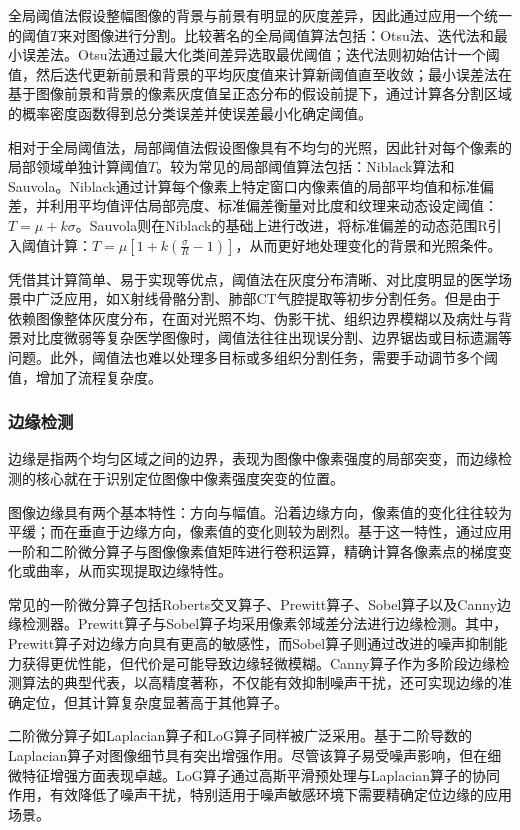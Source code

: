 全局阈值法假设整幅图像的背景与前景有明显的灰度差异，因此通过应用一个统一的阈值$T$来对图像进行分割。比较著名的全局阈值算法包括：Otsu法、迭代法和最小误差法。Otsu法通过最大化类间差异选取最优阈值；迭代法则初始估计一个阈值，然后迭代更新前景和背景的平均灰度值来计算新阈值直至收敛；最小误差法在基于图像前景和背景的像素灰度值呈正态分布的假设前提下，通过计算各分割区域的概率密度函数得到总分类误差并使误差最小化确定阈值。

相对于全局阈值法，局部阈值法假设图像具有不均匀的光照，因此针对每个像素的局部领域单独计算阈值$T$。较为常见的局部阈值算法包括：Niblack算法和Sauvola。Niblack通过计算每个像素上特定窗口内像素值的局部平均值和标准偏差，并利用平均值评估局部亮度、标准偏差衡量对比度和纹理来动态设定阈值：$ T=\mu+k \sigma $。Sauvola则在Niblack的基础上进行改进，将标准偏差的动态范围R引入阈值计算：$ T=\mu\left[1+k\left(\frac{\sigma}{R}-1\right)\right] $，从而更好地处理变化的背景和光照条件。

凭借其计算简单、易于实现等优点，阈值法在灰度分布清晰、对比度明显的医学场景中广泛应用，如X射线骨骼分割、肺部CT气腔提取等初步分割任务。但是由于依赖图像整体灰度分布，在面对光照不均、伪影干扰、组织边界模糊以及病灶与背景对比度微弱等复杂医学图像时，阈值法往往出现误分割、边界锯齿或目标遗漏等问题。此外，阈值法也难以处理多目标或多组织分割任务，需要手动调节多个阈值，增加了流程复杂度。

\subsubsection{边缘检测}


边缘是指两个均匀区域之间的边界，表现为图像中像素强度的局部突变，而边缘检测的核心就在于识别定位图像中像素强度突变的位置。

图像边缘具有两个基本特性：方向与幅值。沿着边缘方向，像素值的变化往往较为平缓；而在垂直于边缘方向，像素值的变化则较为剧烈。基于这一特性，通过应用一阶和二阶微分算子与图像像素值矩阵进行卷积运算，精确计算各像素点的梯度变化或曲率，从而实现提取边缘特性。

常见的一阶微分算子包括Roberts交叉算子、Prewitt算子、Sobel算子以及Canny边缘检测器。Prewitt算子与Sobel算子均采用像素邻域差分法进行边缘检测。其中，Prewitt算子对边缘方向具有更高的敏感性，而Sobel算子则通过改进的噪声抑制能力获得更优性能，但代价是可能导致边缘轻微模糊。Canny算子作为多阶段边缘检测算法的典型代表，以高精度著称，不仅能有效抑制噪声干扰，还可实现边缘的准确定位，但其计算复杂度显著高于其他算子。

二阶微分算子如Laplacian算子和LoG算子同样被广泛采用。基于二阶导数的Laplacian算子对图像细节具有突出增强作用。尽管该算子易受噪声影响，但在细微特征增强方面表现卓越。LoG算子通过高斯平滑预处理与Laplacian算子的协同作用，有效降低了噪声干扰，特别适用于噪声敏感环境下需要精确定位边缘的应用场景。

